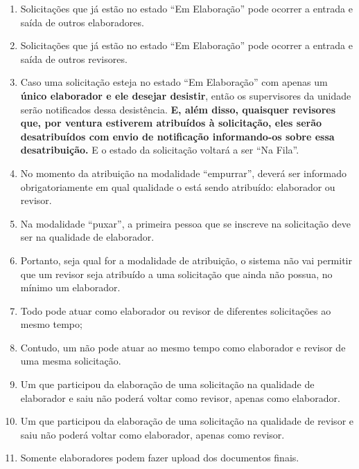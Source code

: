 \begin{enumerate}
	\item Solicitações que já estão no estado ``Em Elaboração''  pode ocorrer a entrada e saída de outros elaboradores.

	\item Solicitações que já estão no estado ``Em Elaboração''  pode ocorrer a entrada e saída de outros revisores.
	
	\item Caso uma solicitação esteja no estado ``Em Elaboração'' com apenas um \hypertarget{data230823mudanca1}{\textbf{único elaborador e ele desejar desistir}}, então os supervisores da unidade serão notificados dessa desistência. \textbf{E, além disso, quaisquer revisores que, por ventura estiverem atribuídos à solicitação, eles serão desatribuídos com envio de notificação informando-os sobre essa desatribuição.} E o estado da solicitação voltará a ser ``Na Fila''.
	
	\item No momento da atribuição na modalidade ``empurrar'', deverá ser informado obrigatoriamente em qual qualidade o \CL está sendo atribuído: elaborador ou revisor. 
	
	\item Na modalidade ``puxar'', a primeira pessoa que se inscreve na solicitação deve ser na qualidade de elaborador.
	
	\item Portanto, seja qual for a modalidade de atribuição, o sistema não vai permitir que um revisor seja atribuído a uma solicitação que ainda não possua, no mínimo um elaborador.
	
	\item Todo \CL pode atuar como elaborador ou revisor de diferentes solicitações ao mesmo tempo;
	
	\item Contudo, um \CL não pode atuar ao mesmo tempo como elaborador e revisor de uma mesma solicitação.
	
	\item Um \CL que participou da elaboração de uma solicitação na qualidade de elaborador e saiu não poderá voltar como revisor, apenas como elaborador.
	
	\item Um \CL que participou da elaboração de uma solicitação na qualidade de revisor e saiu não poderá voltar como elaborador, apenas como revisor.
	
	\item Somente elaboradores podem fazer upload dos documentos finais.
	

\end{enumerate}
